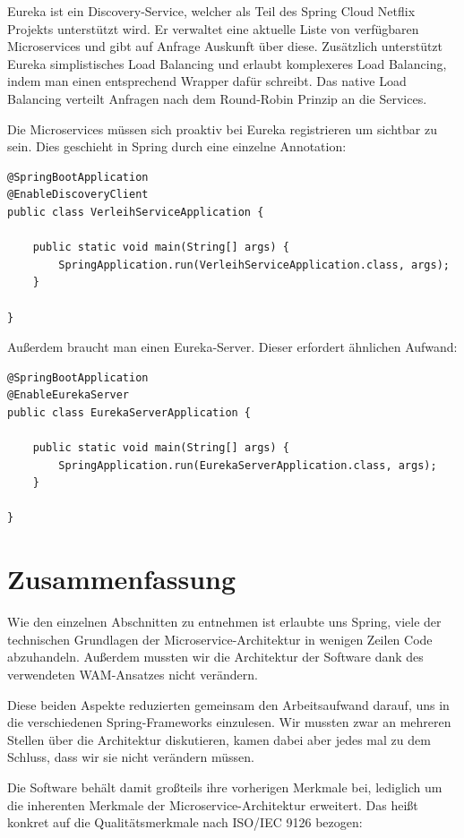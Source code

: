 \documentclass{article}
\begin{document}
Eureka ist ein Discovery-Service, welcher als Teil des Spring Cloud Netflix Projekts unterstützt wird.
Er verwaltet eine aktuelle Liste von verfügbaren Microservices und gibt auf Anfrage Auskunft über diese.
Zusätzlich unterstützt Eureka simplistisches Load Balancing und erlaubt komplexeres Load Balancing, indem man einen entsprechend Wrapper dafür schreibt.
Das native Load Balancing verteilt Anfragen nach dem Round-Robin Prinzip an die Services.

Die Microservices müssen sich proaktiv bei Eureka registrieren um sichtbar zu sein.
Dies geschieht in Spring durch eine einzelne Annotation:

\begin{lstlisting}
@SpringBootApplication
@EnableDiscoveryClient
public class VerleihServiceApplication {

	public static void main(String[] args) {
		SpringApplication.run(VerleihServiceApplication.class, args);
	}

}
\end{lstlisting}

Außerdem braucht man einen Eureka-Server.
Dieser erfordert ähnlichen Aufwand:

\begin{lstlisting}
@SpringBootApplication
@EnableEurekaServer
public class EurekaServerApplication {

	public static void main(String[] args) {
		SpringApplication.run(EurekaServerApplication.class, args);
	}
	
}
\end{lstlisting}

\section{Zusammenfassung}

Wie den einzelnen Abschnitten zu entnehmen ist erlaubte uns Spring, viele der technischen Grundlagen der Microservice-Architektur in wenigen Zeilen Code abzuhandeln.
Außerdem mussten wir die Architektur der Software dank des verwendeten WAM-Ansatzes nicht verändern.

Diese beiden Aspekte reduzierten gemeinsam den Arbeitsaufwand darauf, uns in die verschiedenen Spring-Frameworks einzulesen.
Wir mussten zwar an mehreren Stellen über die Architektur diskutieren, kamen dabei aber jedes mal zu dem Schluss, dass wir sie nicht verändern müssen.

Die Software behält damit großteils ihre vorherigen Merkmale bei, lediglich um die inherenten Merkmale der Microservice-Architektur erweitert.
Das heißt konkret auf die Qualitätsmerkmale nach ISO/IEC 9126 bezogen:
\end{document}
